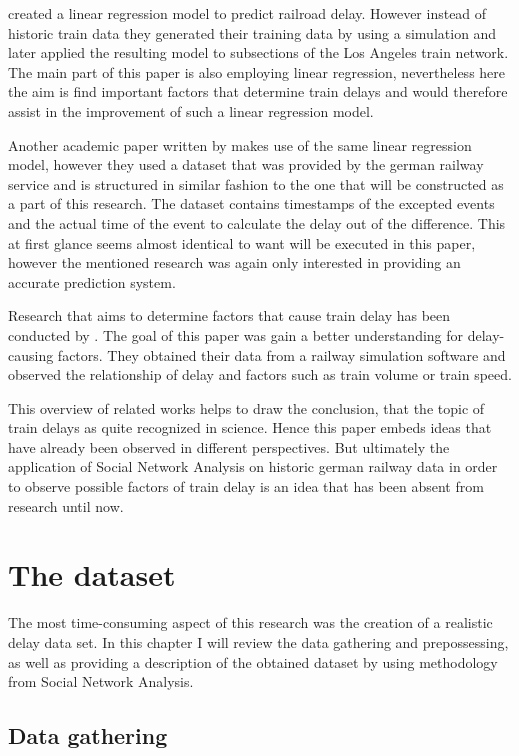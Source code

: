 \documentclass[12pt,a4paper]{article}
\begin{document}
\cite{Murali2010} created a linear regression model to predict railroad delay. 
However instead of historic train data they generated their training data by using a simulation and later applied the resulting model to subsections of the Los Angeles train network. 
The main part of this paper is also employing linear regression, nevertheless here the aim is find important factors that determine train delays and would therefore assist in the improvement of such a linear regression model.

Another academic paper written by \cite{Hauck2020} makes use of the same linear regression model, however they used a dataset that was provided by the german railway service and is structured in similar fashion to the one that will be constructed as a part of this research. 
The dataset contains timestamps of the excepted events and the actual time of the event to calculate the delay out of the difference. This at first glance seems almost identical to want will be executed in this paper, however the mentioned research was again only interested in providing an accurate prediction system.

Research that aims to determine factors that cause train delay has been conducted by \cite{Dingler2010}. The goal of this paper was gain a better understanding for delay-causing factors. 
They obtained their data from a railway simulation software and observed the relationship of delay and factors such as train volume or train speed.

This overview of related works helps to draw the conclusion, that the topic of train delays as quite recognized in science.
Hence this paper embeds ideas that have already been observed in different perspectives. 
But ultimately the application of Social Network Analysis on historic german railway data in order to observe possible factors of train delay is an idea that has been absent from research until now.  

\maketitle
\section{\label{sec:Related}The dataset}

The most time-consuming aspect of this research was the creation of a realistic delay data set. 
In this chapter I will review the data gathering and prepossessing, as well as providing a description of the obtained dataset by using methodology from Social Network Analysis.

\maketitle
\subsection{\label{sec:Related}Data gathering}


\printbibliography
\end{document}
